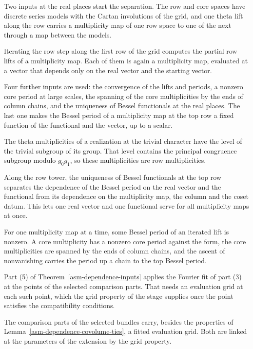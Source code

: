 Two inputs at the real places start the separation. The row and core spaces
have discrete series models with the Cartan involutions of the grid, and one
theta lift along the row carries a multiplicity map of one row space to one of
the next through a map between the models.

Iterating the row step along the first row of the grid computes the partial
row lifts of a multiplicity map. Each of them is again a multiplicity map,
evaluated at a vector that depends only on the real vector and the starting
vector.

Four further inputs are used: the convergence of the lifts and periods, a
nonzero core period at large scales, the spanning of the core multiplicities by
the ends of column chains, and the uniqueness of Bessel functionals at the real
places. The last one makes the Bessel period of a multiplicity map at the top
row a fixed function of the functional and the vector, up to a scalar.

The theta multiplicities of a realization at the trivial character have the
level of the trivial subgroup of its group. That level contains the principal
congruence subgroup modulo $g_0g_1$, so these multiplicities are row
multiplicities.

Along the row tower, the uniqueness of Bessel functionals at the top row
separates the dependence of the Bessel period on the real vector and the
functional from its dependence on the multiplicity map, the column and the
coset datum. This lets one real vector and one functional serve for all
multiplicity maps at once.

For one multiplicity map at a time, some Bessel period of an iterated lift is
nonzero. A core multiplicity has a nonzero core period against the form, the
core multiplicities are spanned by the ends of column chains, and the ascent of
nonvanishing carries the period up a chain to the top Bessel period.

Part (5) of Theorem~\ref{asm-dependence-inputs} applies the Fourier fit of part
(3) at the points of the selected comparison parts. That needs an evaluation
grid at each such point, which the grid property of the stage supplies once the
point satisfies the compatibility conditions.

The comparison parts of the selected bundles carry, besides the properties of
Lemma~\ref{asm-dependence-covolume-ties}, a fitted evaluation grid. Both are
linked at the parameters of the extension by the grid property.

